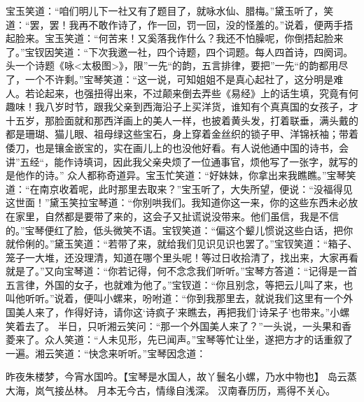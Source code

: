 \documentclass[12pt,oneside]{book}
\begin{document}
宝玉笑道：“咱们明儿下一社又有了题目了，就咏水仙、腊梅。”黛玉听了，笑道：“罢，罢！我再不敢作诗了，作一回，罚一回，没的怪羞的。”说着，便两手捂起脸来。宝玉笑道：“何苦来！又奚落我作什么？我还不怕臊呢，你倒捂起脸来了。”宝钗因笑道：“下次我邀一社，四个诗题，四个词题。每人四首诗，四阕词。头一个诗题《咏<太极图>》，限”一先“的韵，五言排律，要把”一先“的韵都用尽了，一个不许剩。”宝琴笑道：“这一说，可知姐姐不是真心起社了，这分明是难人。若论起来，也强扭得出来，不过颠来倒去弄些《易经》上的话生填，究竟有何趣味！我八岁时节，跟我父亲到西海沿子上买洋货，谁知有个真真国的女孩子，才十五岁，那脸面就和那西洋画上的美人一样，也披着黄头发，打着联垂，满头戴的都是珊瑚、猫儿眼、祖母绿这些宝石，身上穿着金丝织的锁子甲、洋锦袄袖；带着倭刀，也是镶金嵌宝的，实在画儿上的也没他好看。有人说他通中国的诗书，会讲”五经“，能作诗填词，因此我父亲央烦了一位通事官，烦他写了一张字，就写的是他作的诗。”
众人都称奇道异。宝玉忙笑道：“好妹妹，你拿出来我瞧瞧。”宝琴笑道：“在南京收着呢，此时那里去取来？”宝玉听了，大失所望，便说：“没福得见这世面！”黛玉笑拉宝琴道：“你别哄我们。我知道你这一来，你的这些东西未必放在家里，自然都是要带了来的，这会子又扯谎说没带来。他们虽信，我是不信的。”宝琴便红了脸，低头微笑不语。宝钗笑道：“偏这个颦儿惯说这些白话，把你就伶俐的。”黛玉笑道：“若带了来，就给我们见识见识也罢了。”宝钗笑道：“箱子、笼子一大堆，还没理清，知道在哪个里头呢！等过日收拾清了，找出来，大家再看就是了。”又向宝琴道：“你若记得，何不念念我们听听。”宝琴方答道：“记得是一首五言律，外国的女子，也就难为他了。”宝钗道：“你且别念，等把云儿叫了来，也叫他听听。”说着，便叫小螺来，吩咐道：“你到我那里去，就说我们这里有一个外国美人来了，作得好诗，请你这‘诗疯子’来瞧去，再把我们‘诗呆子’也带来。”小螺笑着去了。
半日，只听湘云笑问：“那一个外国美人来了？”一头说，一头果和香菱来了。众人笑道：“人未见形，先已闻声。”宝琴等忙让坐，遂把方才的话重叙了一遍。湘云笑道：“快念来听听。”宝琴因念道：

昨夜朱楼梦，今宵水国吟。【宝琴是水国人，故丫鬟名小螺，乃水中物也】
岛云蒸大海，岚气接丛林。
月本无今古，情缘自浅深。
汉南春历历，焉得不关心。
\end{document}
